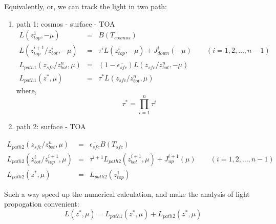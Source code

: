 Equivalently, or, we can track the light in two path:

\begin{enumerate} 
    \item path 1: cosmos - surface - TOA
    \begin{eqnarray} \label{eq:path1rad}
        L(z_{top}^{1}, -\mu) & = & B(T_{cosmos}) \nonumber\\
        L(z_{top}^{i+1}/z_{bot}^{i}, -\mu) & = & \tau^{i}L(z_{top}^{i}, -\mu) + J_{down}^{i}(-\mu) 
        \qquad (i=1,2, \ldots, n-1) \nonumber\\
        L_{path1}(z_{sfc}/z_{bot}^{n}, \mu) & = & (1-\overline{\epsilon_{sfc}})L(z_{sfc}/z_{bot}^{n}, -\mu) \nonumber\\
        L_{path1}(z^{*}, \mu) & = & \tau^{*}L(z_{sfc}/z_{bot}^{n}, \mu)
    \end{eqnarray} 
    where,
    \begin{equation} \label{eq:tau*}
        \tau^{*} = \prod_{i=1}^{n}\tau^{i}
    \end{equation}
    \item path 2: surface - TOA
\end{enumerate}
    \begin{eqnarray} \label{eq:path2rad}
        L_{path2}(z_{sfc}/z_{bot}^{n}, \mu) & = & \overline{\epsilon_{sfc}}B(T_{sfc}) \nonumber\\
        L_{path2}(z_{bot}^{i}/z_{top}^{i+1}, \mu) & = & \tau^{i+1}L_{path2}(z_{bot}^{i+1}, \mu) + J_{up}^{i+1}(\mu) 
        \qquad (i=1,2, \ldots, n-1) \nonumber\\
        L_{path2}(z^{*}, \mu) & = & L_{path2}(z_{top}^{1})
    \end{eqnarray}

Such a way speed up the numerical calculation, and make the analysis of light propogation convenient:
\begin{equation} \label{eq:path1 and path2}
    L(z^{*}, \mu) = L_{path1}(z^{*}, \mu) + L_{path2}(z^{*}, \mu)
\end{equation}